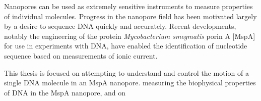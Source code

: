 
Nanopores can be used as extremely sensitive instruments to measure properties of individual molecules.  Progress in the nanopore field has been motivated largely by a desire to sequence DNA quickly and accurately.  Recent developments, notably the engineering of the protein \textit{Mycobacterium smegmatis} porin A [MspA] for use in experiments with DNA, have enabled the identification of nucleotide sequence based on measurements of ionic current.

This thesis is focused on attempting to understand and control the motion of a single DNA molecule in an MspA nanopore.  measuring the biophysical properties of DNA in the MspA nanopore, and on 